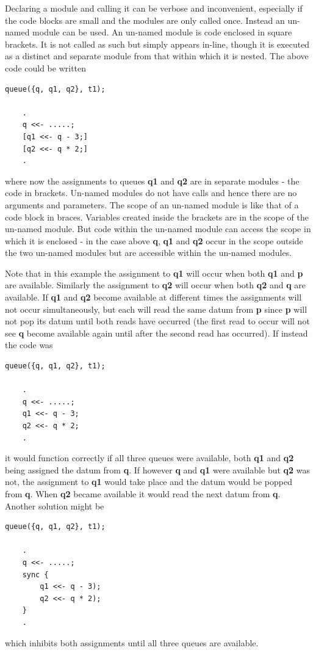 \documentclass[10pt,a4paper,twoside,fleqn]{article}
\newcommand{\var}[1]{{\bf #1}} %
\begin{document}
    Declaring a module and calling it can be verbose and inconvenient, especially if
    the code blocks are small and the modules are only called once. Instead an un-named
    module can be used. An un-named module is code enclosed in square brackets. It is
    not called as such but simply appears in-line, though it is executed as a distinct
    and separate module from that within which it is nested. The above code could be
    written
    \begin{lstlisting}[language=threepl]
    queue({q, q1, q2}, t1);
    
    .
    q <<- .....;
    [q1 <<- q - 3;]
    [q2 <<- q * 2;]
    .
    \end{lstlisting}
    where now the assignments to queues \var{q1} and \var{q2} are in separate
    modules - the code in brackets. Un-named modules do not have calls and hence
    there are no arguments and parameters. The scope of an un-named module is like
    that of a code block in braces. Variables created inside the brackets are in
    the scope of the un-named module. But code within the un-named module can
    access the scope in which it is enclosed - in the case above \var{q}, \var{q1}
    and \var{q2} occur in the scope outside the two un-named modules but are
    accessible within the un-named modules.
    
    Note that in this example the assignment to \var{q1} will occur when both
    \var{q1} and \var{p} are available. Similarly  the assignment to \var{q2} will
    occur when both \var{q2} and \var{q} are available. If \var{q1} and \var{q2}
    become available at different times the assignments will not occur
    simultaneously, but each will read the same datum from \var{p} since \var{p}
    will not pop its datum until both reads have occurred (the first read to occur
    will not see \var{q} become available again until after the second read has
    occurred). If instead the code was
    \begin{lstlisting}[language=threepl]
    queue({q, q1, q2}, t1);
    
    .
    q <<- .....;
    q1 <<- q - 3;
    q2 <<- q * 2;
    .
    \end{lstlisting}
    it would function correctly if all three queues were available, both \var{q1}
    and \var{q2} being assigned the datum from \var{q}. If however \var{q} and
    \var{q1} were available but \var{q2} was not, the assignment to \var{q1} would
    take place and the datum would be popped from \var{q}. When \var{q2} became
    available it would read the next datum from \var{q}. Another solution might be 
    \begin{lstlisting}[language=threepl]
    queue({q, q1, q2}, t1);
    
    .
    q <<- .....;
    sync {
        q1 <<- q - 3);
        q2 <<- q * 2);
    }
    .
    \end{lstlisting}
    which inhibits both assignments until all three queues are available.
    
\end{document}

